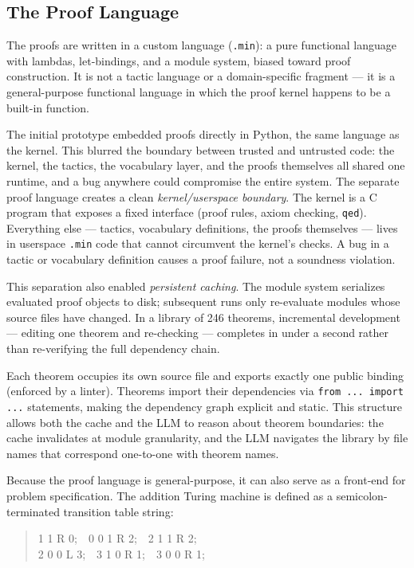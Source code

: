 \documentclass[letterpaper]{article}
\begin{document}
\subsection{The Proof Language}
\label{sec:lang}

The proofs are written in a custom language (\texttt{.min}): a pure
functional language with lambdas, let-bindings, and a module system,
biased toward proof construction. It is not a tactic language or a
domain-specific fragment --- it is a general-purpose functional language
in which the proof kernel happens to be a built-in function.

The initial prototype embedded proofs directly in Python, the same
language as the kernel. This blurred the boundary between trusted and
untrusted code: the kernel, the tactics, the vocabulary layer, and the
proofs themselves all shared one runtime, and a bug anywhere could
compromise the entire system. The separate proof language creates a clean
\emph{kernel/userspace boundary}. The kernel is a C program that
exposes a fixed interface (proof rules, axiom checking, \texttt{qed}).
Everything else --- tactics, vocabulary definitions, the proofs
themselves --- lives in userspace \texttt{.min} code that cannot
circumvent the kernel's checks. A bug in a tactic or vocabulary
definition causes a proof failure, not a soundness violation.

This separation also enabled \emph{persistent caching}. The module system
serializes evaluated proof objects to disk; subsequent runs only re-evaluate
modules whose source files have changed. In a library of 246 theorems,
incremental development --- editing one theorem and re-checking --- completes
in under a second rather than re-verifying the full dependency chain.

Each theorem occupies its own source file and exports exactly one public
binding (enforced by a linter). Theorems import their dependencies via
\texttt{from ... import ...} statements, making the dependency graph
explicit and static. This structure allows both the cache and the LLM to
reason about theorem boundaries: the cache invalidates at module
granularity, and the LLM navigates the library by file names that
correspond one-to-one with theorem names.

Because the proof language is general-purpose, it can also serve as a
front-end for problem specification. The addition Turing machine is
defined as a semicolon-terminated transition table string:

\begin{quote}
 1 1 R 0;\ \ 0 0 1 R 2;\ \ 2 1 1 R 2;\\
2 0 0 L 3;\ \ 3 1 0 R 1;\ \ 3 0 0 R 1;
\end{quote}
\end{document}
